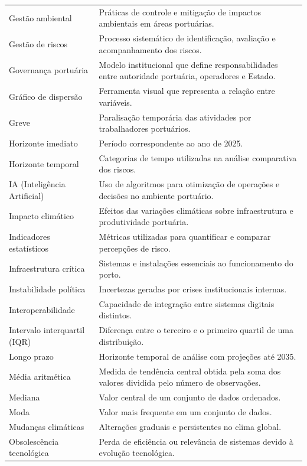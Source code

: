 \documentclass[
  portuguese,
  letterpaper,
  DIV=11,
  numbers=noendperiod]{scrreprt}
\begin{document}
\begin{longtable}[]{@{}
  >{\raggedright\arraybackslash}p{}
  >{\raggedright\arraybackslash}p{}@{}}
Gestão ambiental & Práticas de controle e mitigação de impactos
ambientais em áreas portuárias. \\
Gestão de riscos & Processo sistemático de identificação, avaliação e
acompanhamento dos riscos. \\
Governança portuária & Modelo institucional que define responsabilidades
entre autoridade portuária, operadores e Estado. \\
Gráfico de dispersão & Ferramenta visual que representa a relação entre
variáveis. \\
Greve & Paralisação temporária das atividades por trabalhadores
portuários. \\
Horizonte imediato & Período correspondente ao ano de 2025. \\
Horizonte temporal & Categorias de tempo utilizadas na análise
comparativa dos riscos. \\
IA (Inteligência Artificial) & Uso de algoritmos para otimização de
operações e decisões no ambiente portuário. \\
Impacto climático & Efeitos das variações climáticas sobre
infraestrutura e produtividade portuária. \\
Indicadores estatísticos & Métricas utilizadas para quantificar e
comparar percepções de risco. \\
Infraestrutura crítica & Sistemas e instalações essenciais ao
funcionamento do porto. \\
Instabilidade política & Incertezas geradas por crises institucionais
internas. \\
Interoperabilidade & Capacidade de integração entre sistemas digitais
distintos. \\
Intervalo interquartil (IQR) & Diferença entre o terceiro e o primeiro
quartil de uma distribuição. \\
Longo prazo & Horizonte temporal de análise com projeções até 2035. \\
Média aritmética & Medida de tendência central obtida pela soma dos
valores dividida pelo número de observações. \\
Mediana & Valor central de um conjunto de dados ordenados. \\
Moda & Valor mais frequente em um conjunto de dados. \\
Mudanças climáticas & Alterações graduais e persistentes no clima
global. \\
Obsolescência tecnológica & Perda de eficiência ou relevância de
sistemas devido à evolução tecnológica. \\

\end{longtable}
\end{document}
